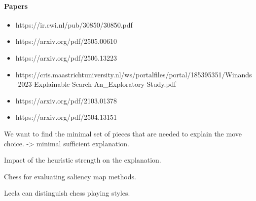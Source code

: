 \paragraph{Papers}
\begin{itemize}
    \item https://ir.cwi.nl/pub/30850/30850.pdf
    \item https://arxiv.org/pdf/2505.00610
    \item https://arxiv.org/pdf/2506.13223
    \item https://cris.maastrichtuniversity.nl/ws/portalfiles/portal/185395351/Winands-2023-Explainable-Search-An\_Exploratory-Study.pdf
    \item https://arxiv.org/pdf/2103.01378
    \item https://arxiv.org/pdf/2504.13151
\end{itemize}

We want to find the minimal set of pieces that are needed to explain the move choice. -> minimal sufficient explanation.

Impact of the heuristic strength on the explanation.


Chess for evaluating saliency map methods.

Leela can distinguish chess playing styles.
